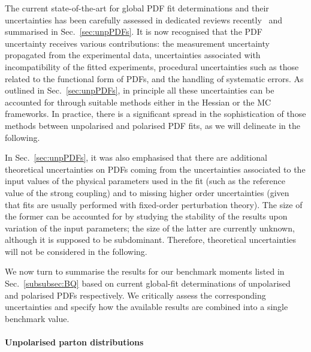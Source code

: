 The current state-of-the-art for global PDF fit determinations and their 
uncertainties has been carefully assessed in dedicated reviews
recently~\cite{Forte:2013wc,Jimenez-Delgado:2013sma} and summarised in
Sec.~\ref{sec:unpPDFs}. 
%
It is now recognised that the PDF uncertainty receives various contributions: 
the measurement uncertainty propagated from the
experimental data, uncertainties associated with incompatibility of the 
fitted experiments, procedural uncertainties such as those related to the
functional form of PDFs, and the handling of systematic errors.
%
As outlined in Sec.~\ref{sec:unpPDFs}, in principle all these uncertainties 
can be accounted for through suitable methods either in the Hessian or the 
MC frameworks.
%
In practice, there is a significant spread in the sophistication 
of those methods between unpolarised and polarised PDF fits, as we will 
delineate in the following.

In Sec.~\ref{sec:unpPDFs}, it was also emphasised that there are additional 
theoretical uncertainties on PDFs coming from the uncertainties associated to 
the input values of the physical parameters used in the fit (such as the 
reference value of the strong coupling) and to missing higher order
uncertainties (given that fits are usually performed with fixed-order
perturbation theory).
%
The size of the former can be accounted for by studying the stability of the 
results upon variation of the input parameters; the size of the latter are 
currently unknown, although it is supposed to be subdominant.
%
Therefore, theoretical uncertainties will not be considered in the following.

We now turn to summarise the results for our benchmark moments listed in 
Sec.~\ref{subsubsec:BQ} based on current global-fit determinations of
unpolarised and polarised PDFs respectively.
%
We critically assess the corresponding uncertainties and specify how the
available results are combined into a single benchmark value.

\paragraph{Unpolarised parton distributions}

